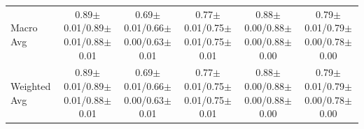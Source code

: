 \begin{table}[!t]
{\begin{tabular}{l|cccc|cccc|cccc|cccc|cccc}
Macro Avg & \multicolumn{4}{c|}{0.89$\pm$0.01/0.89$\pm$0.01/0.88$\pm$0.01} & \multicolumn{4}{c|}{0.69$\pm$0.01/0.66$\pm$0.00/0.63$\pm$0.01} & \multicolumn{4}{c|}{0.77$\pm$0.01/0.75$\pm$0.01/0.75$\pm$0.01} & \multicolumn{4}{c|}{0.88$\pm$0.00/0.88$\pm$0.00/0.88$\pm$0.00} & \multicolumn{4}{c}{0.79$\pm$0.01/0.79$\pm$0.00/0.78$\pm$0.00} \\
Weighted Avg & \multicolumn{4}{c|}{0.89$\pm$0.01/0.89$\pm$0.01/0.88$\pm$0.01} & \multicolumn{4}{c|}{0.69$\pm$0.01/0.66$\pm$0.00/0.63$\pm$0.01} & \multicolumn{4}{c|}{0.77$\pm$0.01/0.75$\pm$0.01/0.75$\pm$0.01} & \multicolumn{4}{c|}{0.88$\pm$0.00/0.88$\pm$0.00/0.88$\pm$0.00} & \multicolumn{4}{c}{0.79$\pm$0.01/0.79$\pm$0.00/0.78$\pm$0.00} \\
\bottomrule
\end{tabular}}
\end{table}



